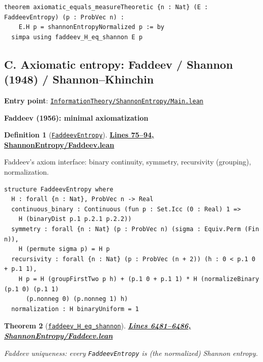 \documentclass[11pt]{article}
\newtheorem{theorem}{Theorem}[section]
\theoremstyle{definition}
\newtheorem{definition}[theorem]{Definition}
\theoremstyle{remark}
\begin{document}
\begin{lstlisting}[caption={Axioms-to-measures bridge (Faddeev -> Shannon)}]
theorem axiomatic_equals_measureTheoretic {n : Nat} (E : FaddeevEntropy) (p : ProbVec n) :
    E.H p = shannonEntropyNormalized p := by
  simpa using faddeev_H_eq_shannon E p
\end{lstlisting}

\subsection*{C. Axiomatic entropy: Faddeev / Shannon (1948) / Shannon--Khinchin}

\textbf{Entry point}: \href{https://github.com/zariuq/ks-foundations-of-inference/blob/main/InformationTheory/ShannonEntropy/Main.lean}{\texttt{InformationTheory/ShannonEntropy/Main.lean}}

\medskip
\textbf{Faddeev (1956): minimal axiomatization}

\begin{definition}[\href{https://github.com/zariuq/ks-foundations-of-inference/blob/main/InformationTheory/ShannonEntropy/Faddeev.lean\#L77}{\texttt{FaddeevEntropy}}]
\textbf{\href{https://github.com/zariuq/ks-foundations-of-inference/blob/main/InformationTheory/ShannonEntropy/Faddeev.lean\#L75-L94}{Lines 75--94, ShannonEntropy/Faddeev.lean}}

Faddeev's axiom interface: binary continuity, symmetry, recursivity (grouping), normalization.
\end{definition}

\begin{lstlisting}[caption={Faddeev axioms (minimal entropy interface)}]
structure FaddeevEntropy where
  H : forall {n : Nat}, ProbVec n -> Real
  continuous_binary : Continuous (fun p : Set.Icc (0 : Real) 1 =>
    H (binaryDist p.1 p.2.1 p.2.2))
  symmetry : forall {n : Nat} (p : ProbVec n) (sigma : Equiv.Perm (Fin n)),
    H (permute sigma p) = H p
  recursivity : forall {n : Nat} (p : ProbVec (n + 2)) (h : 0 < p.1 0 + p.1 1),
    H p = H (groupFirstTwo p h) + (p.1 0 + p.1 1) * H (normalizeBinary (p.1 0) (p.1 1)
      (p.nonneg 0) (p.nonneg 1) h)
  normalization : H binaryUniform = 1
\end{lstlisting}

\begin{theorem}[\href{https://github.com/zariuq/ks-foundations-of-inference/blob/main/InformationTheory/ShannonEntropy/Faddeev.lean\#L6484}{\texttt{faddeev\_H\_eq\_shannon}}]
\textbf{\href{https://github.com/zariuq/ks-foundations-of-inference/blob/main/InformationTheory/ShannonEntropy/Faddeev.lean\#L6481-L6486}{Lines 6481--6486, ShannonEntropy/Faddeev.lean}}

Faddeev uniqueness: every \texttt{FaddeevEntropy} is (the normalized) Shannon entropy.
\end{theorem}
\end{document}
